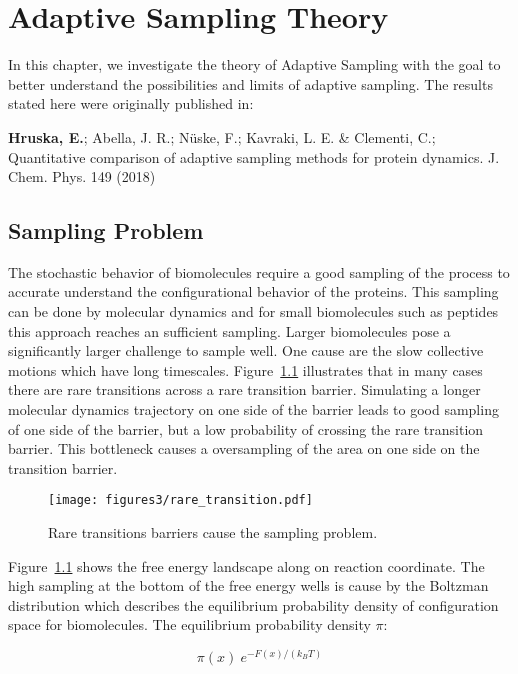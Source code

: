 \afterpage{\null\newpage}
\chapter{Adaptive Sampling Theory\label{ch:chapter3}}


In this chapter, we investigate the theory of Adaptive Sampling with the goal to better understand the possibilities and limits of adaptive sampling. The results stated here were originally published in: 

\cite{Adstrategies2018} \textbf{Hruska, E.}; Abella, J. R.; N\"uske, F.;
Kavraki, L. E. \& Clementi, C.; Quantitative
comparison of adaptive sampling methods
for protein dynamics. J. Chem. Phys. 149 (2018) 

\section{Sampling Problem}

The stochastic behavior of biomolecules require a good sampling of the process to accurate understand the configurational behavior of the proteins. This sampling can be done by molecular dynamics and for small biomolecules such as peptides this approach reaches an sufficient sampling. Larger biomolecules pose a significantly larger challenge to sample well. One cause are the slow collective motions which have long timescales. Figure~\ref{fig:raretransitions} illustrates that in many cases there are rare transitions across a rare transition barrier. Simulating a longer molecular dynamics trajectory on one side of the barrier leads to good sampling of one side of the barrier, but a low probability of crossing the rare transition barrier. This bottleneck causes a oversampling of the area on one side on the transition barrier.  

\begin{figure}[H]
  \centering
  \texttt{[image: figures3/rare\_transition.pdf]}
  \caption{Rare transitions barriers cause the sampling problem.}
  \label{fig:raretransitions}
\end{figure}

Figure~\ref{fig:raretransitions} shows the free energy landscape along on reaction coordinate. The high sampling at the bottom of the free energy wells is cause by the Boltzman distribution which describes the equilibrium probability density of configuration space for biomolecules. The equilibrium probability density $\pi$:

$$\pi(x)~e^{-F(x)/(k_{B}T)}$$

